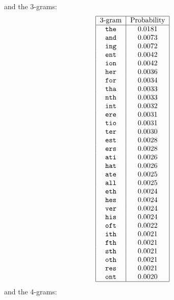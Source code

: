 and the 3-grams:
\[
 \begin{tabular}{|c|c|}
   \hline
   3-gram & Probability \\
   \hline
\texttt{the} &  0.0181\\                
\texttt{and} &  0.0073\\                
\texttt{ing} &  0.0072\\                
\texttt{ent} &  0.0042\\                
\texttt{ion} &  0.0042\\                
\texttt{her} &  0.0036\\                
\texttt{for} &  0.0034\\                
\texttt{tha} &  0.0033\\                
\texttt{nth} &  0.0033\\                
\texttt{int} &  0.0032\\                
\texttt{ere} &  0.0031\\
\texttt{tio} &  0.0031\\
\texttt{ter} &  0.0030\\
\texttt{est} &  0.0028\\
\texttt{ers} &  0.0028\\
\texttt{ati} &  0.0026\\
\texttt{hat} &  0.0026\\
\texttt{ate} &  0.0025\\
\texttt{all} &  0.0025\\
\texttt{eth} &  0.0024\\
\texttt{hes} &  0.0024\\
\texttt{ver} &  0.0024\\
\texttt{his} &  0.0024\\
\texttt{oft} &  0.0022\\
\texttt{ith} &  0.0021\\
\texttt{fth} &  0.0021\\
\texttt{sth} &  0.0021\\
\texttt{oth} &  0.0021\\
\texttt{res} &  0.0021\\
\texttt{ont} &  0.0020\\
   \hline
 \end{tabular}
\]
and the 4-grams:

